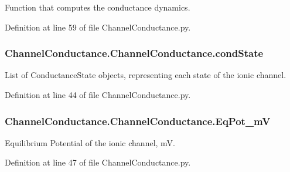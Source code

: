 Function that computes the conductance dynamics. 



Definition at line 59 of file Channel\+Conductance.\+py.

\subsubsection[{\texorpdfstring{cond\+State}{condState}}]{\setlength{\rightskip}{0pt plus 5cm}Channel\+Conductance.\+Channel\+Conductance.\+cond\+State}\hypertarget{class_channel_conductance_1_1_channel_conductance_a628553cbc1efd93b30b0a15afd4417d9}{}\label{class_channel_conductance_1_1_channel_conductance_a628553cbc1efd93b30b0a15afd4417d9}


List of Conductance\+State objects, representing each state of the ionic channel. 



Definition at line 44 of file Channel\+Conductance.\+py.

\subsubsection[{\texorpdfstring{Eq\+Pot\+\_\+mV}{EqPot_mV}}]{\setlength{\rightskip}{0pt plus 5cm}Channel\+Conductance.\+Channel\+Conductance.\+Eq\+Pot\+\_\+mV}\hypertarget{class_channel_conductance_1_1_channel_conductance_a654a73b6cd5853b509e7f7fba060572b}{}\label{class_channel_conductance_1_1_channel_conductance_a654a73b6cd5853b509e7f7fba060572b}


Equilibrium Potential of the ionic channel, mV. 



Definition at line 47 of file Channel\+Conductance.\+py.

